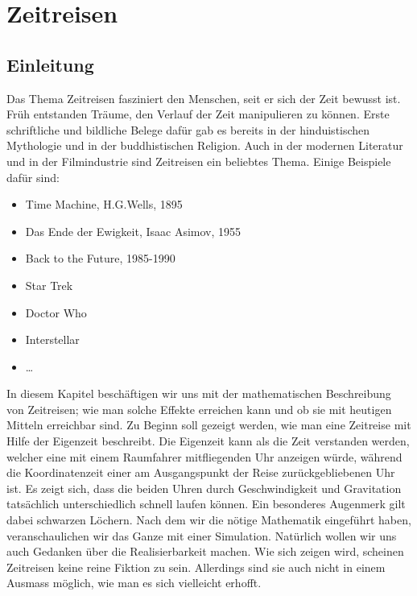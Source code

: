 \chapter{Zeitreisen\label{chapter:thema}}
\begin{refsection}
\section{Einleitung}

	Das Thema Zeitreisen fasziniert den Menschen, seit er sich der Zeit bewusst ist. Früh entstanden Träume, den Verlauf der Zeit manipulieren zu können. Erste schriftliche und bildliche Belege dafür gab es bereits in der hinduistischen Mythologie und in der buddhistischen Religion. Auch in der modernen Literatur und in der Filmindustrie sind Zeitreisen ein beliebtes Thema. Einige Beispiele daf\"ur sind: 
\begin{itemize}
    \item Time Machine, H.G.Wells, 1895 
    \item Das Ende der Ewigkeit, Isaac Asimov, 1955
    \item Back to the Future, 1985-1990
    \item Star Trek
    \item Doctor Who
    \item Interstellar
    \item \dots

\end{itemize}
In diesem Kapitel beschäftigen wir uns mit der mathematischen Beschreibung von Zeitreisen; wie man solche Effekte erreichen kann und ob sie mit heutigen Mitteln erreichbar sind. Zu Beginn soll gezeigt werden, wie man eine Zeitreise mit Hilfe der Eigenzeit beschreibt.
Die Eigenzeit kann als die Zeit verstanden werden, welcher eine mit einem Raumfahrer mitfliegenden Uhr anzeigen würde, während die Koordinatenzeit einer am Ausgangspunkt der Reise zurückgebliebenen Uhr ist.
Es zeigt sich, dass die beiden Uhren durch Geschwindigkeit und Gravitation tatsächlich unterschiedlich schnell laufen können. Ein besonderes Augenmerk gilt dabei schwarzen Löchern. Nach dem wir die nötige Mathematik eingeführt haben, veranschaulichen wir das Ganze mit einer Simulation. Natürlich wollen wir uns auch Gedanken über die Realisierbarkeit machen. Wie sich zeigen wird, scheinen Zeitreisen keine reine Fiktion zu sein. Allerdings sind sie auch nicht in einem Ausmass möglich, wie man es sich vielleicht erhofft.


\end{refsection}
